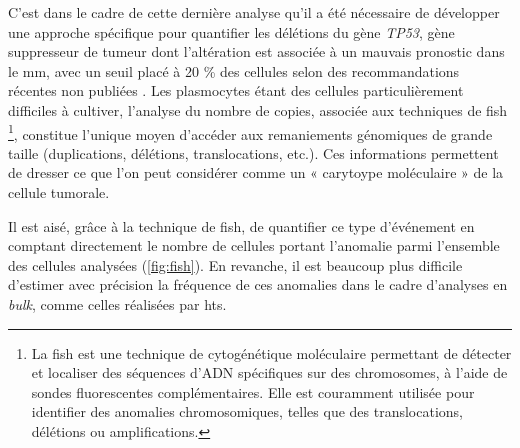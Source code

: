 C'est dans le cadre de cette dernière analyse qu'il a été nécessaire de
développer une approche spécifique pour quantifier les délétions du gène
\textit{TP53}, gène suppresseur de tumeur dont l'altération est associée à un
mauvais pronostic dans le \gls{mm}, avec un seuil placé à 20 \% des cellules
selon des recommandations récentes non publiées
\cite{flyntPrognosisBiologyTargeting2020}. Les plasmocytes étant des cellules
particulièrement difficiles à cultiver, l'analyse du nombre de copies, associée
aux techniques de \gls{fish} \footnote{La \gls{fish} est une technique de
cytogénétique moléculaire permettant de détecter et localiser des séquences
d'ADN spécifiques sur des chromosomes, à l'aide de sondes fluorescentes
complémentaires. Elle est couramment utilisée pour identifier des anomalies
chromosomiques, telles que des translocations, délétions ou amplifications.},
constitue l'unique moyen d'accéder aux remaniements génomiques de grande taille
(duplications, délétions, translocations, etc.). Ces informations permettent de
dresser ce que l'on peut considérer comme un « carytoype moléculaire » de la
cellule tumorale.

Il est aisé, grâce à la technique de \gls{fish}, de quantifier ce type
d'événement en comptant directement le nombre de cellules portant l'anomalie
parmi l'ensemble des cellules analysées (\autoref{fig:fish}). En revanche, il
est beaucoup plus difficile d'estimer avec précision la fréquence de ces
anomalies dans le cadre d'analyses en \textit{bulk}, comme celles réalisées par
\gls{hts}.

